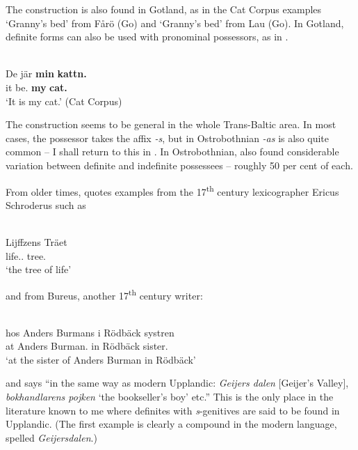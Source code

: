 The construction is also found in Gotland, as in the Cat Corpus examples  ‘Granny’s bed’ from Fårö (Go) and ‘Granny’s bed’ from Lau (Go). In Gotland, definite forms can also be used with pronominal possessors, as in .

\ea\label{}
\\
\gll De  jär  \textbf{min} \textbf{kattn.}\\
it  be.{\prs}  \textbf{my} \textbf{cat.{}}\\
\glt  ‘It is my cat.’ (Cat Corpus)
\z

The construction seems to be general in the whole Trans-Baltic area. In most cases, the possessor takes the affix\textit{ {}-s}, but in Ostrobothnian\textit{ {}-as }is also quite common – I shall return to this in . In Ostrobothnian, \citet{ErikssonEtAl1999} also found considerable variation between definite and indefinite possessees – roughly 50 per cent of each. 

From older times, \citet[523]{Hesselman1908} quotes examples from the 17\textsuperscript{th} century lexicographer Ericus Schroderus such as

\ea\label{}
\\
\gll Lijffzens  Träet\\
life.{\gen}.{}  tree.{}\\
\glt  ‘the tree of life’
\z

and from Bureus, another 17\textsuperscript{th} century writer:


\ea\label{}
\\
\gll hos  Anders  Burmans  i  Rödbäck  systren\\
at  Anders  Burman.{\gen}  in  Rödbäck  sister.{}\\
\glt ‘at the sister of Anders Burman in Rödbäck’
\z

and says “in the same way as modern Upplandic: \textit{Geijers dalen }[Geijer’s Valley], \textit{bokhandlarens pojken} ‘the bookseller’s boy’ etc.” This is the only place in the literature known to me where definites with \textit{s}{}-genitives are said to be found in Upplandic. (The first example is clearly a compound in the modern language, spelled \textit{Geijersdalen}.)

